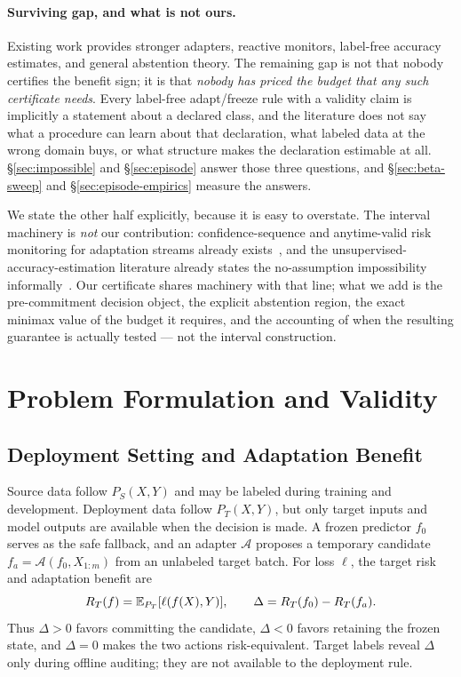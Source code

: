 \paragraph{Surviving gap, and what is not ours.} Existing work provides stronger adapters, reactive
monitors, label-free accuracy estimates, and general abstention theory. The remaining gap is not
that nobody certifies the benefit sign; it is that \emph{nobody has priced the budget that any such
certificate needs}. Every label-free adapt/freeze rule with a validity claim is implicitly a
statement about a declared class, and the literature does not say what a procedure can learn about
that declaration, what labeled data at the wrong domain buys, or what structure makes the
declaration estimable at all. \S\ref{sec:impossible} and \S\ref{sec:episode} answer those three
questions, and \S\ref{sec:beta-sweep} and \S\ref{sec:episode-empirics} measure the answers.

We state the other half explicitly, because it is easy to overstate. The interval machinery is
\emph{not} our contribution: confidence-sequence and anytime-valid risk monitoring for adaptation
streams already exists~\cite{schirmer2025monitoring,podkopaev2022tracking,bar2024poem}, and the
unsupervised-accuracy-estimation literature already states the no-assumption impossibility
informally~\cite{garg2022atc}. Our certificate shares machinery with that line; what we add is the
pre-commitment decision object, the explicit abstention region, the exact minimax value of the
budget it requires, and the accounting of when the resulting guarantee is actually tested --- not
the interval construction.

\section{Problem Formulation and Validity}\label{sec:setup}

\subsection{Deployment Setting and Adaptation Benefit}
Source data follow $P_S(X,Y)$ and may be labeled during training and development. Deployment data follow $P_T(X,Y)$, but only target inputs and model outputs are available when the decision is made. A frozen predictor $f_0$ serves as the safe fallback, and an adapter $\mathcal A$ proposes a temporary candidate $f_a=\mathcal A(f_0,X_{1:m})$ from an unlabeled target batch. For loss $\ell$, the target risk and adaptation benefit are
\begin{equation}
R_T(f)=\mathbb{E}_{P_T}[\ell(f(X),Y)],\qquad
\Delta=R_T(f_0)-R_T(f_a).
\end{equation}
Thus $\Delta>0$ favors committing the candidate, $\Delta<0$ favors retaining the frozen state, and $\Delta=0$ makes the two actions risk-equivalent. Target labels reveal $\Delta$ only during offline auditing; they are not available to the deployment rule.

